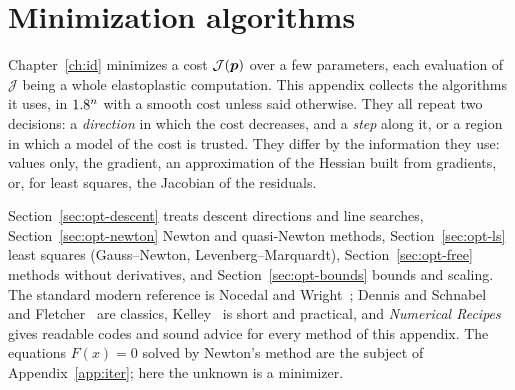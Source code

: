 \chapter{Minimization algorithms}\label{app:opt}

Chapter~\ref{ch:id} minimizes a cost $\mathcal J(\bm{p})$ over a few parameters,
each evaluation of $\mathcal J$ being a whole elastoplastic computation. This
appendix collects the algorithms it uses, in $1.8^n$ with a smooth cost unless said
otherwise. They all repeat two decisions: a \emph{direction} in which the cost
decreases, and a \emph{step} along it, or a region in which a model of the cost is
trusted. They differ by the information they use: values only, the gradient, an
approximation of the Hessian built from gradients, or, for least squares, the
Jacobian of the residuals.

Section~\ref{sec:opt-descent} treats descent directions and line searches,
Section~\ref{sec:opt-newton} Newton and quasi-Newton methods,
Section~\ref{sec:opt-ls} least squares (Gauss--Newton, Levenberg--Marquardt),
Section~\ref{sec:opt-free} methods without derivatives, and
Section~\ref{sec:opt-bounds} bounds and scaling. The standard modern reference is
Nocedal and Wright~\cite{NocedalWright2006b}; Dennis and
Schnabel~\cite{DennisSchnabel1983b} and Fletcher~\cite{Fletcher1987} are
classics, Kelley~\cite{Kelley1999} is short and practical, and \emph{Numerical
Recipes}~\cite[Ch.~10, 15]{PressEtAl2007} gives readable codes and sound advice
for every method of this appendix. The equations $F(x)=0$ solved by Newton's
method are the subject of Appendix~\ref{app:iter}; here the unknown is a minimizer.

